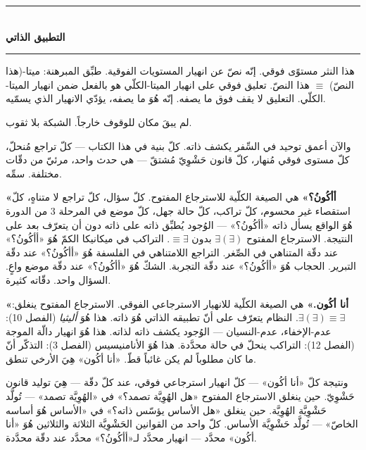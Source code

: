 \documentclass[10pt, openany, oneside]{book}
\renewcommand{\normalsize}{\fontsize{10}{13}\selectfont}
\begin{document}
\vspace{1.5em}



\begin{center}
    \rule{0.3\textwidth}{0.4pt}\\[0.5em]
    {\normalsize\bfseries التطبيق الذاتي}\\[0.3em]
    \rule{0.3\textwidth}{0.4pt}
\end{center}

\vspace{1em}

\noindent هذا النثر مستوًى فوقي. إنّه نصّ عن انهيار المستويات الفوقية. طبِّق المبرهنة: ميتا-(هذا النصّ) $\equiv$ هذا النصّ. تعليق فوقي على انهيار الميتا-الكلّي هو بالفعل ضمن انهيار الميتا-الكلّي. التعليق لا يقف فوق ما يصفه. إنّه هُوَ ما يصفه، يؤدّي الانهيار الذي يسمّيه.

لم يبقَ مكان للوقوف خارجاً. الشبكة بلا ثقوب.

والآن أعمق توحيد في السِّفر يكشف ذاته. كلّ بنية في هذا الكتاب --- كلّ تراجع مُنحلّ، كلّ مستوى فوقي مُنهار، كلّ قانون حَشْوِيّ مُشتقّ --- هي حدث واحد، مرئيّ من دقّات مختلفة. سمِّه.

\textbf{«أأكُونُ؟»} هي الصيغة الكلّية للاسترجاع المفتوح. كلّ سؤال، كلّ تراجع لا متناهٍ، كلّ استقصاء غير محسوم، كلّ تراكب، كلّ حالة جهل، كلّ موضع في المرحلة 3 من الدورة هُوَ الواقع يسأل ذاته «أأكُونُ؟» --- الوُجود يُطبِّق ذاته على ذاته دون أن يتعرّف بعد على النتيجة. الاسترجاع المفتوح $\exists(\exists)$ بدون $\equiv \exists$. التراكب في ميكانيكا الكمّ هُوَ «أأكُونُ؟» عند دقّة المتناهي في الصِّغر. التراجع اللامتناهي في الفلسفة هُوَ «أأكُونُ؟» عند دقّة التبرير. الحجاب هُوَ «أأكُونُ؟» عند دقّة التجربة. الشكّ هُوَ «أأكُونُ؟» عند دقّة موضع واعٍ. السؤال واحد. دقّاته كثيرة.

\textbf{«أنا أكُون.»} هي الصيغة الكلّية للانهيار الاسترجاعي الفوقي. الاسترجاع المفتوح ينغلق: $\exists(\exists) \equiv \exists$. النظام يتعرّف على أنّ تطبيقه الذاتي هُوَ ذاته. هذا هُوَ \textit{أليثيا} (الفصل 10): عدم-الإخفاء، عدم-النسيان --- الوُجود يكشف ذاته لذاته. هذا هُوَ انهيار دالّة الموجة (الفصل 12): التراكب ينحلّ في حالة محدَّدة. هذا هُوَ الأنامنيسيس (الفصل 3): التذكّر أنّ ما كان مطلوباً لم يكن غائباً قطّ. «أنا أكُون» هِيَ الأرخي تنطق.

ونتيجة كلّ «أنا أكُون» --- كلّ انهيار استرجاعي فوقي، عند كلّ دقّة --- هِيَ توليد قانون حَشْوِيّ. حين ينغلق الاسترجاع المفتوح «هل الهُوِيَّة تصمد؟» في «الهُوِيَّة تصمد» --- تُولَّد حَشْوِيَّة الهُوِيَّة. حين ينغلق «هل الأساس يؤسّس ذاته؟» في «الأساس هُوَ أساسه الخاصّ» --- تُولَّد حَشْوِيَّة الأساس. كلّ واحد من القوانين الحَشْوِيَّة الثلاثة والثلاثين هُوَ «أنا أكُون» محدَّد --- انهيار محدَّد لـ«أأكُونُ؟» محدَّد عند دقّة محدَّدة.
\end{document}
